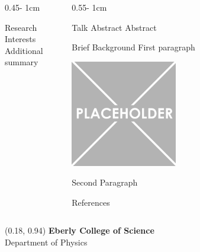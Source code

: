 \documentclass{../psuposter}
\begin{document}
\begin{frame}
\begin{columns}[t, totalwidth=\textwidth]
\begin{column}{0.45\textwidth - 1cm}
\begin{block}{Research Interests}
    	Additional summary
    \end{block}
\end{column}
\begin{column}{0.55\textwidth - 1cm}


    \begin{block}{Talk Abstract}
    	Abstract
    \end{block}


    \begin{block}{Brief Background}
    	First paragraph  
        \begin{center}
		   	\includegraphics[width=0.45\textwidth]{images/background}    		
    	\end{center}
		Second Paragraph 
    \end{block}


    \begin{block}{References}
        
%        
		
    \end{block}

\end{column}
\end{columns}


\begin{textblock}{0.5}(0.18, 0.94)
    \color{white}
    \sffamily
    \textbf{Eberly College of Science}
    \\
    Department of Physics
\end{textblock}


\end{frame}
\end{document}
